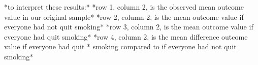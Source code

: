 \documentclass[
  10pt,
  a4paper,
]{book}
\newenvironment{Shaded}{\begin{snugshade}}{\end{snugshade}}
\newcommand{\KeywordTok}[1]{\textcolor[rgb]{0.00,0.46,0.62}{#1}}
\newcommand{\NormalTok}[1]{\textcolor[rgb]{0.00,0.46,0.62}{#1}}
\newcommand{\OtherTok}[1]{\textcolor[rgb]{0.00,0.46,0.62}{#1}}
\begin{document}
\begin{Shaded}
\begin{Highlighting}[]
\NormalTok{*to interpret these results:*}
\NormalTok{*}\OtherTok{row}\NormalTok{ 1, column 2, is the observed }\KeywordTok{mean}\NormalTok{ outcome }\OtherTok{value} \KeywordTok{in}\NormalTok{ our original }\KeywordTok{sample}\NormalTok{*}
\NormalTok{*}\OtherTok{row}\NormalTok{ 2, column 2, is the }\KeywordTok{mean}\NormalTok{ outcome }\OtherTok{value} \KeywordTok{if}\NormalTok{ everyone had }\KeywordTok{not}\NormalTok{ quit smoking*}
\NormalTok{*}\OtherTok{row}\NormalTok{ 3, column 2, is the }\KeywordTok{mean}\NormalTok{ outcome }\OtherTok{value} \KeywordTok{if}\NormalTok{ everyone had quit smoking*}
\NormalTok{*}\OtherTok{row}\NormalTok{ 4, column 2, is the }\KeywordTok{mean}\NormalTok{ difference outcome }\OtherTok{value} \KeywordTok{if}\NormalTok{ everyone had quit }
\NormalTok{* smoking compared to }\KeywordTok{if}\NormalTok{ everyone had }\KeywordTok{not}\NormalTok{ quit smoking*}
\end{Highlighting}
\end{Shaded}
\end{document}
